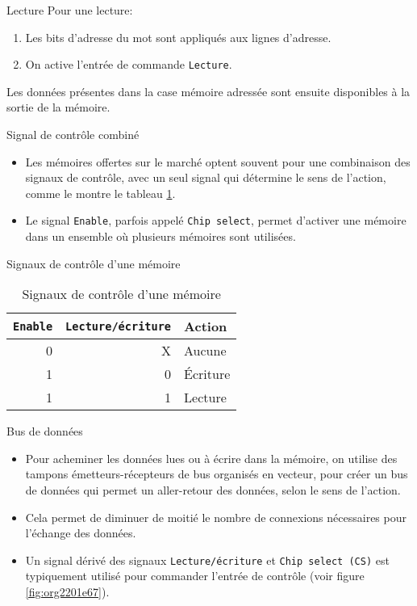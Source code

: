 \documentclass[presentation]{beamer}
\begin{document}
\begin{frame}[label={sec:orgf99f026},fragile]{Lecture}
 Pour une lecture:

\begin{enumerate}
\item Les bits d'adresse du mot sont appliqués aux lignes d'adresse.
\item On active l'entrée de commande \texttt{Lecture}.
\end{enumerate}

Les données présentes dans la case mémoire adressée sont ensuite
disponibles à la sortie de la mémoire.
\end{frame}

\begin{frame}[label={sec:org9d4129d},fragile]{Signal de contrôle combiné}
 \begin{itemize}
\item Les mémoires offertes sur le marché optent souvent pour une combinaison des signaux de contrôle, avec un seul signal qui détermine le sens de l'action, comme le montre le tableau \ref{tab:org453a6f0}.

\item Le signal \texttt{Enable}, parfois appelé \texttt{Chip select}, permet d'activer une mémoire dans un ensemble où plusieurs mémoires sont utilisées.
\end{itemize}
\end{frame}

\begin{frame}[label={sec:org9a01f99},fragile]{Signaux de contrôle d'une mémoire}
 \begin{table}[htbp]
\caption{\label{tab:org453a6f0}Signaux de contrôle d'une mémoire}
\centering
\begin{tabular}{rrl}
\texttt{Enable} & \texttt{Lecture/écriture} & Action\\[0pt]
\hline
0 & X & Aucune\\[0pt]
1 & 0 & Écriture\\[0pt]
1 & 1 & Lecture\\[0pt]
\end{tabular}
\end{table}
\end{frame}

\begin{frame}[label={sec:orgbdfd94a},fragile]{Bus de données}
 \begin{itemize}
\item Pour acheminer les données lues ou à écrire dans la mémoire, on utilise des tampons émetteurs-récepteurs de bus organisés en vecteur, pour créer un \alert{bus de données} qui permet un aller-retour des données, selon le sens de l'action.

\item Cela permet de diminuer de moitié le nombre de connexions nécessaires pour l'échange des données.

\item Un signal dérivé des signaux \texttt{Lecture/écriture} et \texttt{Chip select (CS)} est typiquement utilisé pour commander l'entrée de contrôle (voir figure \ref{fig:org2201e67}).
\end{itemize}
\end{frame}
\end{document}
